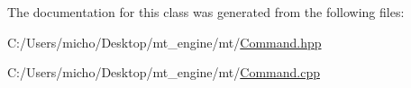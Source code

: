 The documentation for this class was generated from the following files\+:\begin{DoxyCompactItemize}
\item 
C\+:/\+Users/micho/\+Desktop/mt\+\_\+engine/mt/\hyperlink{_command_8hpp}{Command.\+hpp}\item 
C\+:/\+Users/micho/\+Desktop/mt\+\_\+engine/mt/\hyperlink{_command_8cpp}{Command.\+cpp}\end{DoxyCompactItemize}
